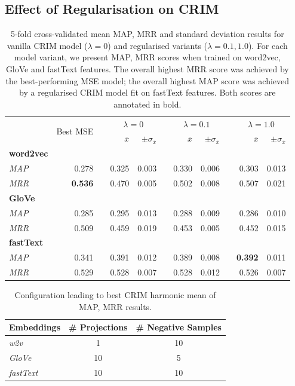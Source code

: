 \subsection{Effect of Regularisation on CRIM}
\begin{table}\centering
\begin{tabular}{@{}lrcrrcrrcrr@{}}\toprule
& \multirow{2}{*}{Best MSE} & \phantom{a} &  \multicolumn{2}{c}{$\lambda=0$} & \phantom{a} & \multicolumn{2}{c}{$\lambda=0.1$} & \phantom{a} & \multicolumn{2}{c}{$\lambda=1.0$}\\
\cmidrule{4-5} \cmidrule{7-8} \cmidrule{10-11}
&  && $\bar{x}$ & $\pm\sigma_{\bar{x}}$ && $\bar{x}$ & $\pm\sigma_{\bar{x}}$ && $\bar{x}$ & $\pm\sigma_{\bar{x}}$ \\ \midrule
\textbf{word2vec} \\
\textit{MAP} & 0.278 && 0.325 & 0.003 && 0.330 & 0.006 && 0.303 & 0.013 \\
\textit{MRR} & \textbf{0.536} && 0.470 & 0.005 && 0.502 & 0.008 && 0.507 & 0.021 \\
\cmidrule{2-11}
\textbf{GloVe} \\
\textit{MAP} & 0.285 && 0.295 & 0.013 && 0.288 & 0.009 && 0.286 & 0.010 \\
\textit{MRR} & 0.509 && 0.459 & 0.019 && 0.453 & 0.005 && 0.452 & 0.015 \\
\cmidrule(lr){2-11}
\textbf{fastText} \\
\textit{MAP} & 0.341 && 0.391 & 0.012 && 0.389 & 0.008 && \textbf{0.392} & 0.011 \\
\textit{MRR} & 0.529 && 0.528 & 0.007 && 0.528 & 0.012 && 0.526 & 0.007 \\
\bottomrule
\end{tabular}
\caption[Regularisation effect on CRIM cross-validated MAP and MRR results]{
5-fold cross-validated mean MAP, MRR and standard deviation results for vanilla CRIM model ($\lambda=0$) and regularised variants ($\lambda=0.1, 1.0$).  For each model variant, we present MAP, MRR scores when trained on word2vec, GloVe and fastText features.  The overall highest MRR score was achieved by the best-performing MSE model; the overall highest MAP score was achieved by a regularised CRIM model fit on fastText features.  Both scores are annotated in bold.  }
\label{tab:crim_regularised}
\end{table}

\begin{table}\centering
\begin{tabular}{@{}lcc@{}}\toprule
\textbf{Embeddings} & \textbf{\# Projections} & \textbf{\# Negative Samples}\\
\midrule
\textit{w2v} & 1 & 10\\
\textit{GloVe} & 10 & 5\\
\textit{fastText} & 10 & 10\\
\bottomrule
\end{tabular}
\caption{Configuration leading to best CRIM harmonic mean of MAP, MRR results.}\label{tab:crim_best_parameter_combination}
\end{table}

